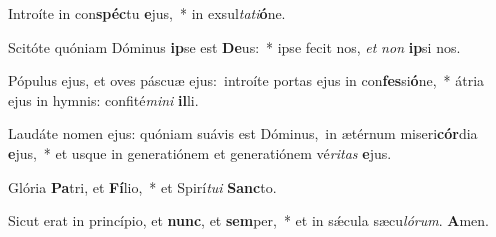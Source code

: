 Introíte in con\textbf{spéc}tu \textbf{e}jus,~* in exsul\textit{ta}\textit{ti}\textbf{ó}ne.

Scitóte quóniam Dóminus \textbf{ip}se est \textbf{De}us:~* ipse fecit nos, \textit{et} \textit{non} \textbf{ip}si nos.

Pópulus ejus, et oves páscuæ ejus:~\reddagger introíte portas ejus in con\textbf{fes}si\textbf{ó}ne,~* átria ejus in hymnis: confité\textit{mi}\textit{ni} \textbf{il}li.

Laudáte nomen ejus: quóniam suávis est Dóminus,~\reddagger in ætérnum miseri\textbf{cór}dia \textbf{e}jus,~* et usque in generatiónem et generatiónem vé\textit{ri}\textit{tas} \textbf{e}jus.

Glória \textbf{Pa}tri, et \textbf{Fí}lio,~* et Spirí\textit{tu}\textit{i} \textbf{Sanc}to.

Sicut erat in princípio, et \textbf{nunc}, et \textbf{sem}per,~* et in sǽcula sæcu\textit{ló}\textit{rum}. \textbf{A}men.
